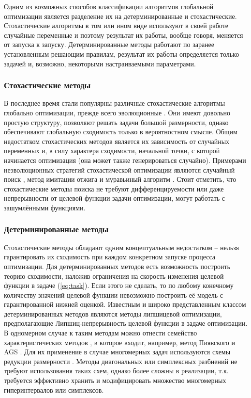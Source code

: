 Одним из возможных способов классификации алгоритмов глобальной оптимизации является разделение их
на детерминированные и стохастические. Стохастические алгоритмы в том или ином виде используют в своей работе
случайные переменные и поэтому результат их работы, вообще говоря, меняется от запуска к запуску. Детерминированные методы
работают по заранее установленным решающим правилам, результат их работы определяется только задачей и,
возможно, некоторыми настраиваемыми параметрами.

\subsubsection{Стохастические методы}

В последнее время стали популярны различные стохастические алгоритмы глобально оптимизации,
прежде всего эволюционные \cite{Storn1997, SCHLUTER2009, KennedyEberhart1995}.
Они имеют довольно простую структуру, позволяют решать задачи большой размерности,
однако обеспечивают глобальную сходимость только в вероятностном смысле. Общим недостатком
стохастических методов является их зависимость от случайных переменных и, в силу характера сходимости,
начальной точки, с которой начинается оптимизация (она может также генерироваться случайно).
Примерами неэволюционных стратегий стохастической оптимизации являются случайный поиск \cite{rastrigin1963},
метод имитации отжига \cite{XIANG1997216} и муравьиный алгоритм \cite{ZhangACO2008}. Стоит отметить, что
стохастические методы поиска не требуют дифференцируемости или даже непрерывности от целевой функции задачи оптимизации,
могут работать с зашумлёнными функциями.

\subsubsection{Детерминированные методы}

Стохастические методы обладают одним концептуальным недостатком -- нельзя гарантировать их сходимость при
каждом конкретном запуске процесса оптимизации. Для детерминированных методов есть возможность построить теорию сходимости,
наложив ограничения на скорость изменения целевой функции в задаче (\ref{eq:task}). Если этого не сделать, то
по любому конечному количеству значений целевой функции невозможно построить её модель с гарантированной нижней оценкой.
Известным и широко представленным классом детерминированных методов являются методы липшицевой оптимизации, предполагающие
Липшиц-непрерывность целевой функции в задаче оптимизации. В одномерном случае к таким методам можно отнести семейство
характеристических методов \cite{gorodetsky2007}, в которое входит, например, метод Пиявского \cite{pijavsky1972} и AGS \cite{strongin1978}.
Для их применение в случае многомерных задач используются схемы редукции размерности \cite{strongin1978}.
Методы диагональных \cite{Sergeyev2015} или симплексных \cite{Zilinskas2014} разбиений не требуют использования
таких схем, однако более сложны в реализации, т.к. требуется эффективно хранить и модифицировать множество многомерных гиперинтервалов
или симплексов.

